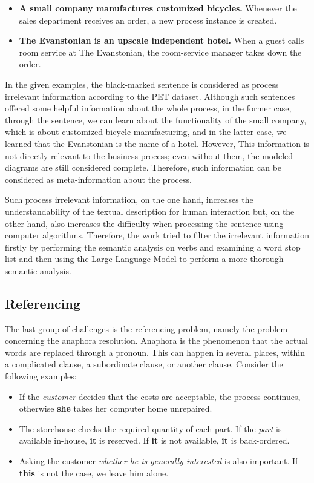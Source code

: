 \begin{itemize}
    \item \textbf{A small company manufactures customized bicycles.} Whenever the sales department receives an order, a new process instance is created.
    \item \textbf{The Evanstonian is an upscale independent hotel.} When a guest calls room service at The Evanstonian, the room-service manager takes down the order.
\end{itemize}

In the given examples, the black-marked sentence is considered as process irrelevant information according to the PET dataset. Although such sentences offered some helpful information about the whole process, in the former case, through the sentence, we can learn about the functionality of the small company, which is about customized bicycle manufacturing, and in the latter case, we learned that the Evanstonian is the name of a hotel. However, This information is not directly relevant to the business process; even without them, the modeled diagrams are still considered complete. Therefore, such information can be considered as meta-information about the process.

Such process irrelevant information, on the one hand, increases the understandability of the textual description for human interaction but, on the other hand, also increases the difficulty when processing the sentence using computer algorithms. Therefore, the work tried to filter the irrelevant information firstly by performing the semantic analysis on verbs and examining a word stop list and then using the Large Language Model to perform a more thorough semantic analysis. 

\subsection{Referencing}
\label{sec:solution:referencing}
The last group of challenges is the referencing problem, namely the problem concerning the anaphora resolution. Anaphora is the phenomenon that the actual words are replaced through a pronoun. This can happen in several places, within a complicated clause, a subordinate clause, or another clause. Consider the following examples:

\begin{itemize}
    \item If the \textit{customer} decides that the costs are acceptable, the process continues, otherwise \textbf{she} takes her computer home unrepaired.
    \item The storehouse checks the required quantity of each part. If the \textit{part} is available in-house, \textbf{it} is reserved. If \textbf{it} is not available, \textbf{it} is back-ordered.
    \item Asking the customer \textit{whether he is generally interested} is also important. If \textbf{this} is not the case, we leave him alone.
\end{itemize}

